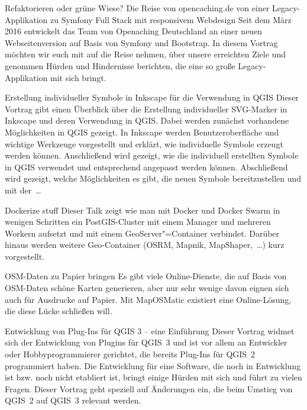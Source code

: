 %
{Refaktorieren oder grüne Wiese?}%
{Die Reise von opencaching.de von einer Legacy-Applikation zu Symfony Full Stack mit \mbox{responsivem} Webdesign}%
{%
Seit dem März 2016 entwickelt das Team von Openaching Deutschland an einer neuen Webseitenversion
auf Basis von Symfony und Bootstrap. In diesem Vortrag möchten wir euch mit auf die Reise nehmen,
über unsere erreichten Ziele und genommen Hürden und Hindernisse berichten, die eine so große
Legacy-Applikation mit sich bringt.%
}




%
{Erstellung individueller Symbole in Inkscape für die Verwendung in QGIS}%
{}%
{%
Dieser Vortrag gibt einen Überblick über die Erstellung individueller SVG-Marker in Inkscape und
deren Verwendung in QGIS. Dabei werden zunächst vorhandene Möglichkeiten in QGIS gezeigt. In
Inkscape werden Benutzeroberfläche und wichtige Werkzeuge vorgestellt und erklärt, wie individuelle
Symbole erzeugt werden können. Anschließend wird gezeigt, wie die individuell erstellten Symbole in
QGIS verwendet und entsprechend angepasst werden können.  Abschließend wird gezeigt, welche
Möglichkeiten es gibt, die neuen Symbole bereitzustellen und  mit der~\dots%
}

%
{Dockerize stuff}%
{}%
{%
Dieser Talk zeigt wie man mit Docker und Docker Swarm in wenigen Schritten ein PostGIS-Cluster mit
einem Manager und mehreren Workern aufsetzt und mit einem GeoServer"=Container verbindet. Darüber
hinaus werden weitere Geo-Container (OSRM, Mapnik, MapShaper,~\dots) kurz vorgestellt.%
}

%
{OSM-Daten zu Papier bringen}%
{}%
{%
Es gibt viele Online-Dienste, die auf Basis von OSM-Daten schöne Karten generieren, aber nur sehr
wenige davon eignen sich auch für Ausdrucke auf Papier. Mit MapOSMatic existiert eine
Online-Lösung, die diese Lücke schließen will.%
}


%
{Entwicklung von Plug-Ins für QGIS 3 -- eine Einführung}%
{}%
{%
Dieser Vortrag widmet sich der Entwicklung von Plugins für QGIS~3 und ist vor allem an Entwickler
oder Hobbyprogrammierer gerichtet, die bereits Plug-Ins für QGIS~2 programmiert haben. Die
Entwicklung für eine Software, die noch in Entwicklung ist bzw. noch nicht etabliert ist, bringt
einige Hürden mit sich und führt zu vielen Fragen. Dieser Vortrag geht speziell auf Änderungen ein,
die beim Umstieg von QGIS~2 auf QGIS~3 relevant werden.%
}

